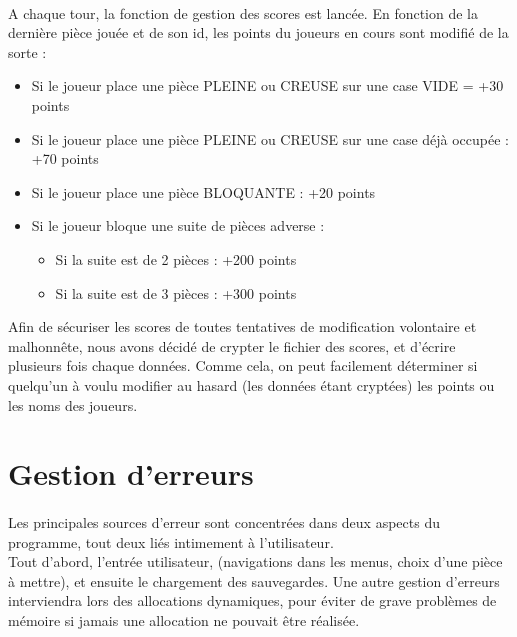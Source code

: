 \documentclass{report}
\begin{document}
        \paragraph*{} %
	A chaque tour, la fonction de gestion des scores est lancée. En fonction de la dernière pièce jouée et de son id, les points du joueurs en cours sont modifié de la sorte : \\
	\begin{itemize}
		\item Si le joueur place une pièce PLEINE ou CREUSE sur une case VIDE = +30 points 
		\item Si le joueur place une pièce PLEINE ou CREUSE sur une case déjà occupée : +70 points 
		\item Si le joueur place une pièce BLOQUANTE : +20 points 
		\item Si le joueur bloque une suite de pièces adverse : \\
		\begin{itemize}
			\item Si la suite est de 2 pièces : +200 points 
			\item Si la suite est de 3 pièces : +300 points \\
		\end{itemize}
	\end{itemize}
	Afin de sécuriser les scores de toutes tentatives de modification volontaire et malhonnête, nous avons décidé de crypter le fichier des scores, et d'écrire plusieurs fois chaque données. Comme cela, on peut facilement déterminer si quelqu'un à voulu modifier au hasard (les données étant cryptées) les points ou les noms des joueurs. \\



    \newpage
    \section*{Gestion d'erreurs} %
        \paragraph*{}
        Les principales sources d'erreur sont concentrées dans deux aspects du programme, tout deux liés intimement à l'utilisateur.\\
        Tout d'abord, l'entrée utilisateur, (navigations dans les menus, choix d'une pièce à mettre), et ensuite le chargement des sauvegardes.
        Une autre gestion d'erreurs interviendra lors des allocations dynamiques, pour éviter de grave problèmes de mémoire si jamais une allocation ne pouvait être réalisée.
\end{document}
